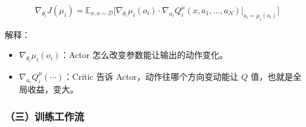 \[
\nabla_{\theta_i}J(\mu_i)
=
\mathbb{E}_{x,a\sim\mathcal{D}}
\bigl[
\nabla_{\theta_i}\mu_i(o_i)
\cdot
\nabla_{a_i}Q_i^{\mu}(x,a_1,\ldots,a_N)
\big|_{a_i=\mu_i(o_i)}
\bigr]
\]

解释：

\begin{itemize}
\tightlist
\item
  \(\nabla_{\theta_i}\mu_i(o_i)\)：Actor 怎么改变参数能让输出的动作变化。
\item
  \(\nabla_{a_i}Q_i^{\mu}(\cdots)\)：Critic 告诉 Actor，动作往哪个方向变动能让 \(Q\) 值，也就是全局收益，变大。
\end{itemize}

\hypertarget{ux4e09ux8badux7ec3ux5de5ux4f5cux6d41}{%
\subsubsection{（三）训练工作流}\label{ux4e09ux8badux7ec3ux5de5ux4f5cux6d41}}


